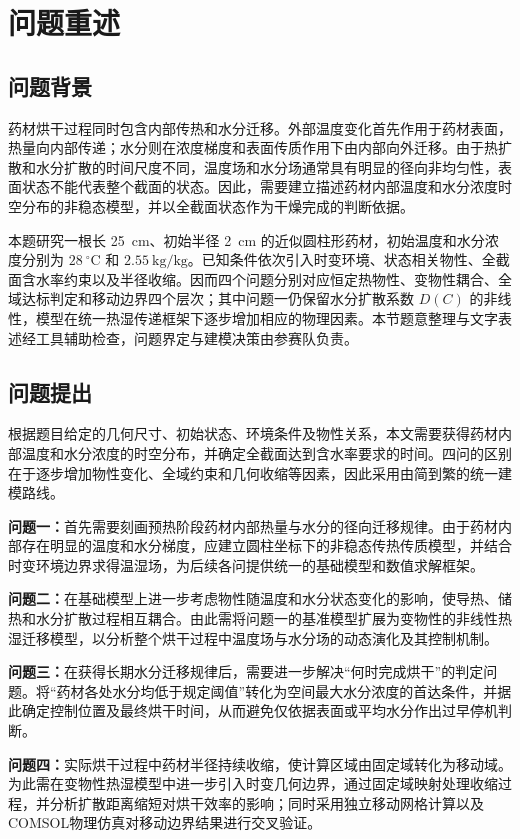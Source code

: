 \vspace*{-30pt}
\enlargethispage{-30pt}
\section{问题重述}

\subsection{问题背景}

药材烘干过程同时包含内部传热和水分迁移。外部温度变化首先作用于药材表面，热量向内部传递；水分则在浓度梯度和表面传质作用下由内部向外迁移。由于热扩散和水分扩散的时间尺度不同，温度场和水分场通常具有明显的径向非均匀性，表面状态不能代表整个截面的状态。因此，需要建立描述药材内部温度和水分浓度时空分布的非稳态模型，并以全截面状态作为干燥完成的判断依据。

本题研究一根长 25~cm、初始半径 2~cm 的近似圆柱形药材，初始温度和水分浓度分别为 $28~{}^\circ\mathrm C$ 和 $2.55~\mathrm{kg/kg}$。已知条件依次引入时变环境、状态相关物性、全截面含水率约束以及半径收缩。因而四个问题分别对应恒定热物性、变物性耦合、全域达标判定和移动边界四个层次；其中问题一仍保留水分扩散系数 $D(C)$ 的非线性，模型在统一热湿传递框架下逐步增加相应的物理因素。本节题意整理与文字表述经工具辅助检查，问题界定与建模决策由参赛队负责。

\subsection{问题提出}

根据题目给定的几何尺寸、初始状态、环境条件及物性关系，本文需要获得药材内部温度和水分浓度的时空分布，并确定全截面达到含水率要求的时间。四问的区别在于逐步增加物性变化、全域约束和几何收缩等因素，因此采用由简到繁的统一建模路线。

\textbf{问题一：}首先需要刻画预热阶段药材内部热量与水分的径向迁移规律。由于药材内部存在明显的温度和水分梯度，应建立圆柱坐标下的非稳态传热传质模型，并结合时变环境边界求得温湿场，为后续各问提供统一的基础模型和数值求解框架。

\textbf{问题二：}在基础模型上进一步考虑物性随温度和水分状态变化的影响，使导热、储热和水分扩散过程相互耦合。由此需将问题一的基准模型扩展为变物性的非线性热湿迁移模型，以分析整个烘干过程中温度场与水分场的动态演化及其控制机制。

\textbf{问题三：}在获得长期水分迁移规律后，需要进一步解决“何时完成烘干”的判定问题。将“药材各处水分均低于规定阈值”转化为空间最大水分浓度的首达条件，并据此确定控制位置及最终烘干时间，从而避免仅依据表面或平均水分作出过早停机判断。

\textbf{问题四：}实际烘干过程中药材半径持续收缩，使计算区域由固定域转化为移动域。为此需在变物性热湿模型中进一步引入时变几何边界，通过固定域映射处理收缩过程，并分析扩散距离缩短对烘干效率的影响；同时采用独立移动网格计算以及COMSOL物理仿真对移动边界结果进行交叉验证。

